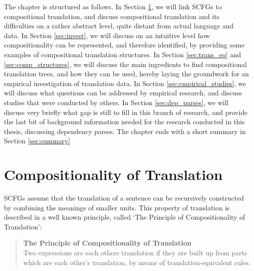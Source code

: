 The chapter is structured as follows. In Section \ref{sec:comp_trans}, we will link SCFGs to compositional translation, and discuss compositional translation and its difficulties on a rather abstract level, quite distant from actual language and data. In Section \ref{sec:invest}, we will discuss on an intuitive level how compositionality can be represented, and therefore identified, by providing some examples of compositional translation structures. In Section \ref{sec:trans_eq} and \ref{sec:comp_structures}, we will discuss the main ingredients to find compositional translation trees, and how they can be used, hereby laying the groundwork for an empirical investigation of translation data. In Section \ref{sec:empirical_studies}, we will discuss what questions can be addressed by empirical research, and discuss studies that were conducted by others. In Section \ref{sec:dep_parses}, we will discuss very briefly what gap is still to fill in this branch of research, and provide the last bit of background information needed for the research conducted in this thesis, discussing dependency parses. The chapter ends with a short summary in Section \ref{sec:summary}

\section{Compositionality of Translation}
\label{sec:comp_trans}

SCFGs assume that the translation of a sentence can be recursively constructed by combining the meanings of smaller units. This property of translation is described in a well known principle, called `The Principle of Compositionality of Translation':

\begin{quote}
\textbf{The Principle of Compositionality of Translation}\\
Two expressions are each others translation if they are built up from parts which are each other's translation, by means of translation-equivalent rules. \citep[e.g.,][]{janssen1998algebraic} \end{quote}

